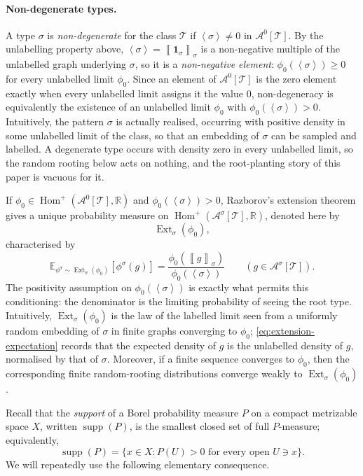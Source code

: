 \documentclass[11pt]{article}
\theoremstyle{definition}
\newcommand{\R}{\mathbb{R}}
\newcommand{\E}{\mathbb{E}}
\newcommand{\A}{\mathcal{A}}
\newcommand{\T}{\mathcal{T}}
\newcommand{\Homp}{\operatorname{Hom}^{+}}
\newcommand{\Ext}{\operatorname{Ext}}
\newcommand{\supp}{\operatorname{supp}}
\newcommand{\brak}[1]{\left\langle #1\right\rangle}
\newcommand{\avg}[2]{\left\llbracket #1 \right\rrbracket_{#2}}
\newcommand{\one}{\mathbf 1}
\begin{document}
\paragraph{Non-degenerate types.}
A type $\sigma$ is \emph{non-degenerate} for the class $\T$ if
$\brak\sigma\neq0$ in $\A^0[\T]$.  By the unlabelling property above,
$\brak\sigma=\avg{\one_\sigma}{\sigma}$ is a non-negative multiple of the unlabelled graph
underlying $\sigma$, so it is a \emph{non-negative element}: $\phi_0(\brak\sigma)\ge0$ for
every unlabelled limit $\phi_0$.  Since an element of $\A^0[\T]$ is the zero element exactly
when every unlabelled limit assigns it the value $0$, non-degeneracy is equivalently the
existence of an unlabelled limit $\phi_0$ with $\phi_0(\brak\sigma)>0$.  Intuitively, the
pattern $\sigma$ is actually realised, occurring with positive density in some unlabelled
limit of the class, so that an embedding of $\sigma$ can be sampled and labelled.  A
degenerate type occurs with density zero in every unlabelled limit, so the random rooting
below acts on nothing, and the root-planting story of this paper is vacuous for it.

If
$\phi_0\in\Homp(\A^0[\T],\R)$ and $\phi_0(\brak\sigma)>0$, Razborov's extension
theorem gives a unique probability measure on
$\Homp(\A^\sigma[\T],\R)$, denoted here by
\[
  \Ext_\sigma(\phi_0),
\]
characterised by
\begin{equation}\label{eq:extension-expectation}
  \E_{\phi^\sigma\sim\Ext_\sigma(\phi_0)}[\phi^\sigma(g)]
  =
  \frac{\phi_0(\avg{g}{\sigma})}{\phi_0(\brak\sigma)}
  \qquad(g\in\A^\sigma[\T]).
\end{equation}
The positivity assumption on $\phi_0(\brak\sigma)$ is exactly what permits this
conditioning: the denominator is the limiting probability of seeing the root type.
Intuitively, $\Ext_\sigma(\phi_0)$ is the law of the labelled limit seen from a uniformly
random embedding of $\sigma$ in finite graphs converging to $\phi_0$;
\eqref{eq:extension-expectation} records that the expected density of $g$ is the
unlabelled density of $g$, normalised by that of $\sigma$.  Moreover, if a finite sequence
converges to $\phi_0$, then the
corresponding finite random-rooting distributions converge weakly to $\Ext_\sigma(\phi_0)$
\cite[Theorems 3.5 and 3.12]{Razborov2007}.

Recall that the \emph{support} of a Borel probability measure $P$ on a compact metrizable
space $X$, written $\supp(P)$, is the smallest closed set of full $P$-measure; equivalently,
\[
  \supp(P)=\{x\in X:P(U)>0\text{ for every open }U\ni x\}.
\]
We will repeatedly use the following elementary consequence.
\end{document}
